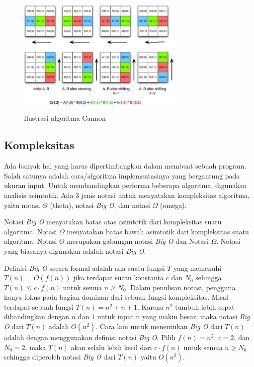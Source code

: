 \documentclass[conference]{IEEEtran}
\begin{document}
\begin{figure}[h]
    \includegraphics[width = 8cm, height = 6cm]{Ilustrasi_algoritma_cannon.png}
    \centering
    \caption{Ilustrasi algoritma Cannon}
\end{figure}

\subsection{Kompleksitas}
Ada banyak hal yang harus dipertimbangkan dalam membuat sebuah program.
Salah satunya adalah cara/algoritma implementasinya yang bergantung pada ukuran input.
Untuk membandingkan performa beberapa algoritma, digunakan analisis asimtotik.
Ada 3 jenis notasi untuk menyatakan kompleksitas algoritma, yaitu notasi $\Theta$ (theta), notasi \textit{Big O}, dan notasi $\Omega$ (omega).

Notasi \textit{Big O} menyatakan batas atas asimtotik dari kompleksitas suatu algoritma.
Notasi $\Omega$ menyatakan batas bawah asimtotik dari kompleksitas suatu algoritma.
Notasi $\Theta$ merupakan gabungan notasi \textit{Big O} dan Notasi $\Omega$.
Notasi yang biasanya digunakan adalah notasi \textit{Big O}.

Definisi \textit{Big O} secara formal adalah ada suatu fungsi $T$ yang memenuhi
$T(n) = O(f(n))$ jika terdapat suatu konstanta $c$ dan $N_0$ sehingga $T(n) \le c \cdot f(n)$ untuk semua $n \ge N_0$.
Dalam penulisan notasi, pengguna hanya fokus pada bagian dominan dari sebuah fungsi kompleksitas.
Misal terdapat sebuah fungsi $T(n) = n^2 + n + 1$.
Karena $n^2$ tumbuh lebih cepat dibandingkan dengan $n$ dan 1 untuk input n yang makin besar, 
maka notasi \textit{Big O} dari $T(n)$ adalah $O(n^2)$.
Cara lain untuk menentukan \textit{Big O} dari $T(n)$ adalah dengan menggunakan definisi notasi \textit{Big O}.
Pilih $f(n) = n^2$, $c = 2$, dan $N_0 = 2$, maka $T(n)$ akan selalu lebih kecil dari $c \cdot f(n)$ untuk semua $n \ge N_0$ 
sehingga diperoleh notasi \textit{Big O} dari $T(n)$ yaitu $O(n^2)$.
\end{document}
